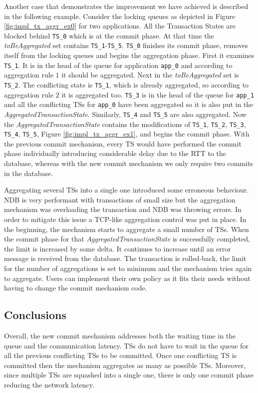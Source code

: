 Another case that demonstrates the improvement we have achieved is
described in the following example. Consider the locking queues as
depicted in Figure \ref{fig:impl_tx_aggr_ex0} for two applications. All the Transaction
States are blocked behind \texttt{TS\_0} which is at the commit
phase. At that time the \emph{toBeAggregated} set contains
\texttt{TS\_1}-\texttt{TS\_5}. \texttt{TS\_0} finishes its commit phase, removes
itself from the locking queues and begins the aggregation phase. First
it examines \texttt{TS\_1}. It is in the head of the queue for
application \texttt{app\_0} and according to aggregation rule $1$ it
should be aggregated. Next in the \emph{toBeAggregated} set is
\texttt{TS\_2}. The conflicting state is \texttt{TS\_1}, which is
already aggregated, so according to aggregation rule $2$ it is
aggregated too. \texttt{TS\_3} is in the head of the queue for
\texttt{app\_1} and all the conflicting TSs for \texttt{app\_0} have
been aggregated so it is also put in the
\emph{AggregatedTransactionState}. Similarly, \texttt{TS\_4} and
\texttt{TS\_5} are also aggregated. Now the
\emph{AggregatedTransactionState} contains the modifications of
\texttt{TS\_1}, \texttt{TS\_2}, \texttt{TS\_3}, \texttt{TS\_4},
\texttt{TS\_5}, Figure \ref{fig:impl_tx_aggr_ex1}, and begins the commit phase. With the previous commit
mechanism, every TS would have performed the commit phase individually introducing
considerable delay due to the RTT to the database, whereas with the
new commit mechanism we only require two commits in the database.

Aggregating several TSs into a single one introduced some erroneous
behaviour. NDB is very performant with transactions of small size but
the aggregation mechanism was overloading the transaction and NDB was
throwing errors. In order to mitigate this issue a TCP-like aggregation control
was put in place. In the beginning, the mechanism starts to aggregate
a small number of TSs. When the commit phase for that
\emph{AggregatedTransactionState} is successfully completed, the limit
is increased by some delta. It continues to increase until an error
message is received from the database. The transaction is rolled-back,
the limit for the number of aggregations is set to minimum and the
mechanism tries again to aggregate. Users can implement their own
policy as it fits their needs without having to change the commit
mechanism code.

\subsection{Conclusions}
\label{ssub:impl_tx_merge_conclusions}
Overall, the new commit mechanism addresses both the waiting time in
the queue and the communication latency. TSs do not have to wait in
the queue for all the previous conflicting TSs to be committed. Once one
conflicting TS is committed then the mechanism aggregates as many as
possible TSs. Moreover, since multiple TSs are squashed into a single
one, there is only one commit phase reducing the network latency.
